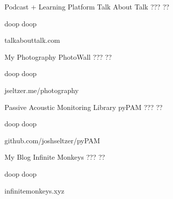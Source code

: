 

\begin{cventries}

  \cventry
    {Podcast + Learning Platform} %
    {Talk About Talk} %
    {???} %
    {??} %
    {
      \begin{cvitems} %
        \item{doop doop}
      \end{cvitems}
    }
    {talkabouttalk.com}

  \cventry
    {My Photography} %
    {PhotoWall} %
    {???} %
    {??} %
    {
      \begin{cvitems} %
        \item{doop doop}
      \end{cvitems}
    }
    {jseltzer.me/photography}

  \cventry
    {Passive Acoustic Monitoring Library} %
    {pyPAM} %
    {???} %
    {??} %
    {
      \begin{cvitems} %
        \item{doop doop}
      \end{cvitems}
    }
    {github.com/joshseltzer/pyPAM}

  \cventry
    {My Blog} %
    {Infinite Monkeys} %
    {???} %
    {??} %
    {
      \begin{cvitems} %
        \item{doop doop}
      \end{cvitems}
    }
    {infinitemonkeys.xyz}


\end{cventries}
